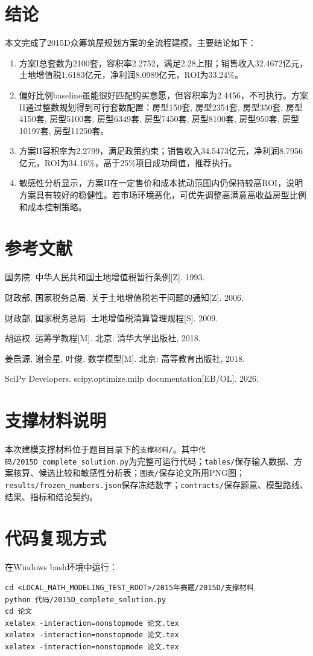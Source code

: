 \documentclass[UTF8,12pt,a4paper]{ctexart}
\begin{document}
\section{结论}
本文完成了2015D众筹筑屋规划方案的全流程建模。主要结论如下：
\begin{enumerate}
\item 方案I总套数为2100套，容积率2.2752，满足2.28上限；销售收入32.4672亿元，土地增值税1.6183亿元，净利润8.0989亿元，ROI为33.24\%。
\item 偏好比例baseline虽能很好匹配购买意愿，但容积率为2.4456，不可执行。方案II通过整数规划得到可行套数配置：房型150套, 房型2354套, 房型350套, 房型4150套, 房型5100套, 房型6349套, 房型7450套, 房型8100套, 房型950套, 房型10197套, 房型11250套。
\item 方案II容积率为2.2799，满足政策约束；销售收入34.5473亿元，净利润8.7956亿元，ROI为34.16\%，高于25\%项目成功阈值，推荐执行。
\item 敏感性分析显示，方案II在一定售价和成本扰动范围内仍保持较高ROI，说明方案具有较好的稳健性。若市场环境恶化，可优先调整高满意高收益房型比例和成本控制策略。
\end{enumerate}

\section*{参考文献}
\begin{enumerate}[label={[\arabic*]},leftmargin=2.5em]
\item 国务院. 中华人民共和国土地增值税暂行条例[Z]. 1993.
\item 财政部, 国家税务总局. 关于土地增值税若干问题的通知[Z]. 2006.
\item 财政部, 国家税务总局. 土地增值税清算管理规程[S]. 2009.
\item 胡运权. 运筹学教程[M]. 北京: 清华大学出版社, 2018.
\item 姜启源, 谢金星, 叶俊. 数学模型[M]. 北京: 高等教育出版社, 2018.
\item SciPy Developers. scipy.optimize.milp documentation[EB/OL]. 2026.
\end{enumerate}

\appendix
\section{支撑材料说明}
本次建模支撑材料位于题目目录下的\texttt{支撑材料/}。其中\texttt{代码/2015D\_complete\_solution.py}为完整可运行代码；\texttt{tables/}保存输入数据、方案核算、候选比较和敏感性分析表；\texttt{图表/}保存论文所用PNG图；\texttt{results/frozen\_numbers.json}保存冻结数字；\texttt{contracts/}保存题意、模型路线、结果、指标和结论契约。

\section{代码复现方式}
在Windows bash环境中运行：
\begin{verbatim}
cd <LOCAL_MATH_MODELING_TEST_ROOT>/2015年赛题/2015D/支撑材料
python 代码/2015D_complete_solution.py
cd 论文
xelatex -interaction=nonstopmode 论文.tex
xelatex -interaction=nonstopmode 论文.tex
xelatex -interaction=nonstopmode 论文.tex
\end{verbatim}
\end{document}
